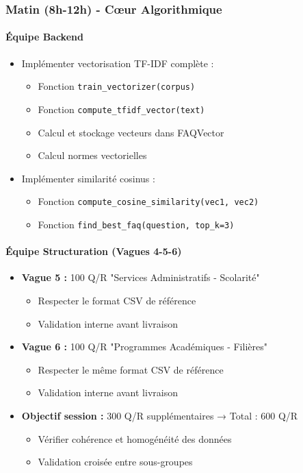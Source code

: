 \documentclass[11pt,a4paper]{article}
\begin{document}
\subsubsection{Matin (8h-12h) - Cœur Algorithmique}

\paragraph{Équipe Backend}
\begin{itemize}
    \item[$\square$] Implémenter vectorisation TF-IDF complète :
    \begin{itemize}
        \item Fonction \texttt{train\_vectorizer(corpus)}
        \item Fonction \texttt{compute\_tfidf\_vector(text)}
        \item Calcul et stockage vecteurs dans FAQVector
        \item Calcul normes vectorielles
    \end{itemize}
    \item[$\square$] Implémenter similarité cosinus :
    \begin{itemize}
        \item Fonction \texttt{compute\_cosine\_similarity(vec1, vec2)}
        \item Fonction \texttt{find\_best\_faq(question, top\_k=3)}
    \end{itemize}
\end{itemize}

\paragraph{Équipe Structuration (Vagues 4-5-6)}
\begin{itemize}
    \item[$\square$] \textbf{Vague 5 :} 100 Q/R "Services Administratifs - Scolarité"
    \begin{itemize}
        \item Respecter le format CSV de référence
        \item Validation interne avant livraison
    \end{itemize}

    \item[$\square$] \textbf{Vague 6 :} 100 Q/R "Programmes Académiques - Filières"
    \begin{itemize}
        \item Respecter le même format CSV de référence
        \item Validation interne avant livraison
    \end{itemize}

    \item[$\square$] \textbf{Objectif session :} 300 Q/R supplémentaires → Total : 600 Q/R
    \begin{itemize}
        \item Vérifier cohérence et homogénéité des données
        \item Validation croisée entre sous-groupes
    \end{itemize}
\end{itemize}
\end{document}
